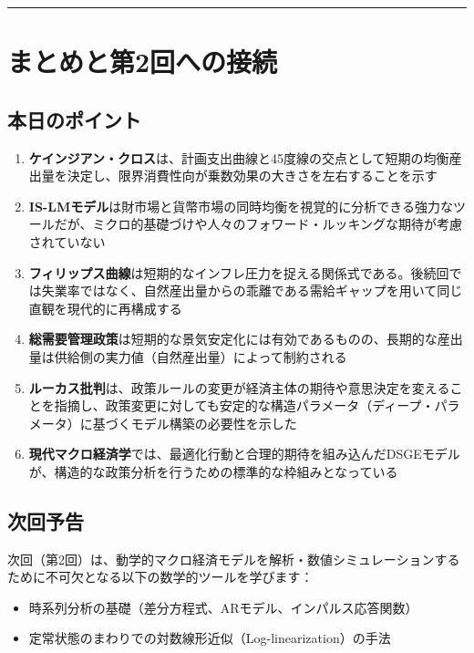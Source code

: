 \documentclass[
  japanese,
  lualatex,
  ja=standard,
  12pt,
  a4paper]{ltjsarticle}
\providecommand{\tightlist}{%
  \setlength{\itemsep}{0pt}\setlength{\parskip}{0pt}}
\begin{document}
\begin{center}\rule{0.5\linewidth}{0.5pt}\end{center}

\section{まとめと第2回への接続}\label{ux307eux3068ux3081ux3068ux7b2c2ux56deux3078ux306eux63a5ux7d9a}

\subsection{本日のポイント}\label{ux672cux65e5ux306eux30ddux30a4ux30f3ux30c8}

\begin{enumerate}
\def\labelenumi{\arabic{enumi}.}
\tightlist
\item
  \textbf{ケインジアン・クロス}は、計画支出曲線と45度線の交点として短期の均衡産出量を決定し、限界消費性向が乗数効果の大きさを左右することを示す
\item
  \textbf{IS-LMモデル}は財市場と貨幣市場の同時均衡を視覚的に分析できる強力なツールだが、ミクロ的基礎づけや人々のフォワード・ルッキングな期待が考慮されていない
\item
  \textbf{フィリップス曲線}は短期的なインフレ圧力を捉える関係式である。後続回では失業率ではなく、自然産出量からの乖離である需給ギャップを用いて同じ直観を現代的に再構成する
\item
  \textbf{総需要管理政策}は短期的な景気安定化には有効であるものの、長期的な産出量は供給側の実力値（自然産出量）によって制約される
\item
  \textbf{ルーカス批判}は、政策ルールの変更が経済主体の期待や意思決定を変えることを指摘し、政策変更に対しても安定的な構造パラメータ（ディープ・パラメータ）に基づくモデル構築の必要性を示した
\item
  \textbf{現代マクロ経済学}では、最適化行動と合理的期待を組み込んだDSGEモデルが、構造的な政策分析を行うための標準的な枠組みとなっている
\end{enumerate}

\subsection{次回予告}\label{ux6b21ux56deux4e88ux544a}

次回（第2回）は、動学的マクロ経済モデルを解析・数値シミュレーションするために不可欠となる以下の数学的ツールを学びます：

\begin{itemize}
\tightlist
\item
  時系列分析の基礎（差分方程式、ARモデル、インパルス応答関数）
\item
  定常状態のまわりでの対数線形近似（Log-linearization）の手法
\end{itemize}
\end{document}
